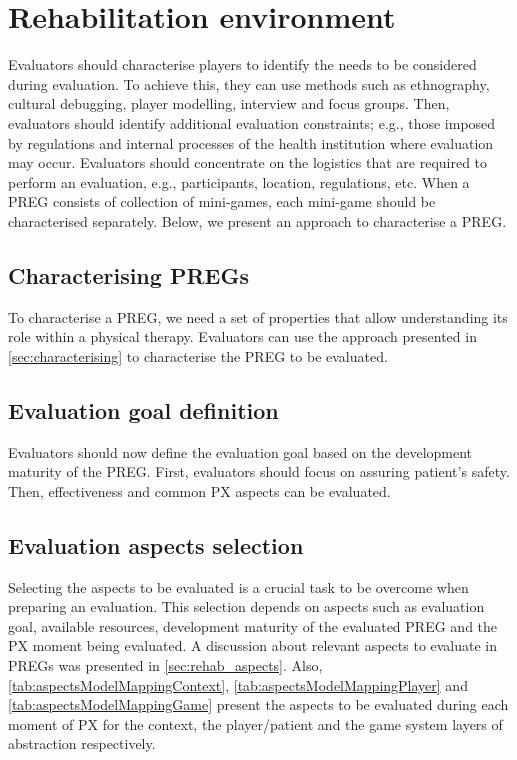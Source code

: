 \section{Rehabilitation environment}
Evaluators should characterise players to identify the needs to be considered during evaluation. To achieve this, they can use methods such as ethnography, cultural debugging, player modelling, interview and focus groups. Then, evaluators should identify additional evaluation constraints; e.g., those imposed by regulations and internal processes of the health institution where evaluation may occur. Evaluators should concentrate on the logistics that are required to perform an evaluation, e.g., participants, location, regulations, etc. When a \ac{PREG} consists of collection of mini-games, each mini-game should be characterised separately. Below, we present an approach to characterise a \ac{PREG}.

\subsection{Characterising \acp{PREG}}
To characterise a \ac{PREG}, we need a set of properties that allow understanding its role within a physical therapy. Evaluators can use the approach presented in \autoref{sec:characterising} to characterise the \ac{PREG} to be evaluated.

\subsection{Evaluation goal definition}
Evaluators should now define the evaluation goal based on the development maturity of the \ac{PREG}. First, evaluators should focus on assuring patient’s safety. Then, effectiveness and common \ac{PX} aspects can be evaluated. 

\subsection{Evaluation aspects selection}
Selecting the aspects to be evaluated is a crucial task to be overcome when preparing an evaluation. This selection depends on aspects such as evaluation goal, available resources, development maturity of the evaluated \ac{PREG} and the \ac{PX} moment being evaluated. A discussion about relevant aspects to evaluate in \acp{PREG} was presented in \autoref{sec:rehab_aspects}. Also, \autoref{tab:aspectsModelMappingContext}, \autoref{tab:aspectsModelMappingPlayer} and \autoref{tab:aspectsModelMappingGame} present the aspects to be evaluated during each moment of \ac{PX} for the context, the player/patient and the game system layers of abstraction respectively.

